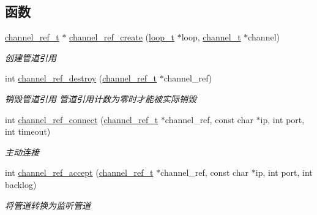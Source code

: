 \subsection*{函数}
\begin{DoxyCompactItemize}
\item 
\hyperlink{a00044_a151271c9d188ef28d4d24bb81dcc1263_a151271c9d188ef28d4d24bb81dcc1263}{channel\+\_\+ref\+\_\+t} $\ast$ \hyperlink{a00041_a82a1514a1b492ad693c7cb28606a5d01_a82a1514a1b492ad693c7cb28606a5d01}{channel\+\_\+ref\+\_\+create} (\hyperlink{a00044_a9c3ad1cd2de83e09f3a7b59fa82c94ee_a9c3ad1cd2de83e09f3a7b59fa82c94ee}{loop\+\_\+t} $\ast$loop, \hyperlink{a00044_a2effb3e20d0b7e5f6d5ac42118e0330b_a2effb3e20d0b7e5f6d5ac42118e0330b}{channel\+\_\+t} $\ast$channel)
\begin{DoxyCompactList}\small\item\em 创建管道引用 \end{DoxyCompactList}\item 
int \hyperlink{a00041_a8c61b880489dcb1a556e3458e748d9f7_a8c61b880489dcb1a556e3458e748d9f7}{channel\+\_\+ref\+\_\+destroy} (\hyperlink{a00044_a151271c9d188ef28d4d24bb81dcc1263_a151271c9d188ef28d4d24bb81dcc1263}{channel\+\_\+ref\+\_\+t} $\ast$channel\+\_\+ref)
\begin{DoxyCompactList}\small\item\em 销毁管道引用 管道引用计数为零时才能被实际销毁 \end{DoxyCompactList}\item 
int \hyperlink{a00084_ga1a8d1f5550cf26313cbb6575e8b2a32c_ga1a8d1f5550cf26313cbb6575e8b2a32c}{channel\+\_\+ref\+\_\+connect} (\hyperlink{a00044_a151271c9d188ef28d4d24bb81dcc1263_a151271c9d188ef28d4d24bb81dcc1263}{channel\+\_\+ref\+\_\+t} $\ast$channel\+\_\+ref, const char $\ast$ip, int port, int timeout)
\begin{DoxyCompactList}\small\item\em 主动连接 \end{DoxyCompactList}\item 
int \hyperlink{a00084_gae9ae0ae2a42eabf6a544ce4e0f001c9e_gae9ae0ae2a42eabf6a544ce4e0f001c9e}{channel\+\_\+ref\+\_\+accept} (\hyperlink{a00044_a151271c9d188ef28d4d24bb81dcc1263_a151271c9d188ef28d4d24bb81dcc1263}{channel\+\_\+ref\+\_\+t} $\ast$channel\+\_\+ref, const char $\ast$ip, int port, int backlog)
\begin{DoxyCompactList}\small\item\em 将管道转换为监听管道 \end{DoxyCompactList}\item 

\end{DoxyCompactItemize}
